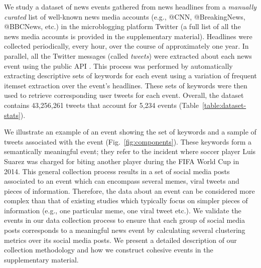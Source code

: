 
We study a dataset of news events gathered from news
headlines from a \emph{manually curated} list of well-known news media
accounts (e.g., @CNN, @BreakingNews, @BBCNews, etc.) in the
microblogging platform Twitter \cite{Twitter_website}
(a full list of all the news media
accounts is provided in the supplementary material). Headlines were
collected periodically, every hour, over the course of approximately
one year. In parallel, all the Twitter messages (called \emph{tweets}) 
were extracted about each news event using the public
API \cite{Twitter_API}.
This process was performed by automatically extracting descriptive
sets of keywords for each event using a variation of frequent itemset
extraction \cite{Tan_Steinbach_Kumar} over the event's headlines.
These sets of keywords were then used to retrieve corresponding user
tweets for each event.  Overall, the dataset contains 43,256,261
tweets that account for 5,234 events (Table~\ref{table:dataset-stats}).

We illustrate an example of an event showing the set of keywords and a
sample of tweets associated with the event
(Fig.~\ref{fig:components}).  These keywords form a semantically
meaningful event; they refer to the incident where soccer player Luis
Suarez was charged for biting another player during the FIFA World Cup
in 2014. This general collection process results in a set of social
media posts associated to an event which can encompass several memes,
viral tweets and pieces of information. Therefore, the data about an
event can be considered more complex than that of existing studies
\cite{Castillo:2014,Szabo:2010,Lerman:2010,Tatar:2011,Pinto:2013,Ahmed:2013,suh2010want}
which typically focus on simpler pieces of information (e.g., one
particular meme, one viral tweet etc.).  We validate the events in our
data collection process to ensure that each group of social media
posts corresponds to a meaningful news event by calculating several
clustering metrics over its social media posts. We present a detailed
description of our collection methodology and how we construct
cohesive events in the supplementary material.


